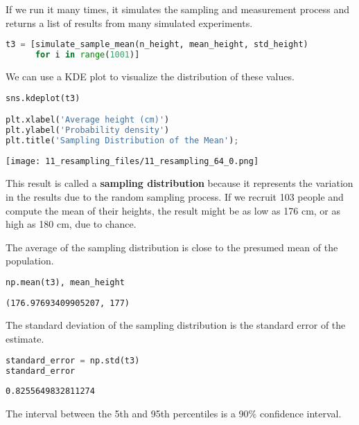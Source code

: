 If we run it many times, it simulates the sampling and measurement
process and returns a list of results from many simulated experiments.

\begin{lstlisting}[language=Python,style=source]
t3 = [simulate_sample_mean(n_height, mean_height, std_height)
      for i in range(1001)]
\end{lstlisting}

We can use a KDE plot to visualize the distribution of these values.

\begin{lstlisting}[language=Python,style=source]
sns.kdeplot(t3)

plt.xlabel('Average height (cm)')
plt.ylabel('Probability density')
plt.title('Sampling Distribution of the Mean');
\end{lstlisting}

\begin{center}
\texttt{[image: 11\_resampling\_files/11\_resampling\_64\_0.png]}
\end{center}

This result is called a \textbf{sampling distribution} because it
represents the variation in the results due to the random sampling
process. If we recruit 103 people and compute the mean of their heights,
the result might be as low as 176 cm, or as high as 180 cm, due to
chance.

The average of the sampling distribution is close to the presumed mean
of the population.

\begin{lstlisting}[language=Python,style=source]
np.mean(t3), mean_height
\end{lstlisting}

\begin{lstlisting}[style=output]
(176.97693409905207, 177)
\end{lstlisting}

The standard deviation of the sampling distribution is the standard
error of the estimate.

\begin{lstlisting}[language=Python,style=source]
standard_error = np.std(t3)
standard_error
\end{lstlisting}

\begin{lstlisting}[style=output]
0.8255649832811274
\end{lstlisting}

The interval between the 5th and 95th percentiles is a 90\% confidence
interval.

